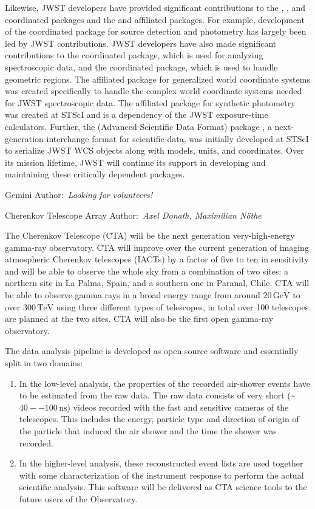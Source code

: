 \documentclass[modern]{aastex631}
\newcommand{\secauthor}[1]{{\color{blue}Author:~\textit{#1}}}
\newcommand{\secunfilled}{{\color{red}Author:~\textit{Looking for volunteers!}}}
\begin{document}
Likewise, JWST developers have provided significant contributions
to the  \citep{photutils}, 
\citep{specutils}, and  \citep{regions} coordinated
packages and the  \citep{gwcs} and 
\citep{synphot} affiliated packages. For example, development of the
 coordinated package for source detection and
photometry has largely been led by JWST contributions. JWST developers
have also made significant contributions to the 
coordinated package, which is used for analyzing spectroscopic data,
and the  coordinated package, which is used to
handle geometric regions. The  affiliated package for
generalized world coordinate systems was created specifically to handle
the complex world coordinate systems needed for JWST spectroscopic
data. The  affiliated package for synthetic photometry
was created at STScI and is a dependency of the JWST exposure-time
calculators. Further, the  (Advanced Scientific Data
Format) package \citep{ASDF}, a next-generation interchange format for
scientific data, was initially developed at STScI to serialize JWST WCS
objects along with \astropypkg models, units, and coordinates. Over
its mission lifetime, JWST will continue its support in developing and
maintaining these critically dependent packages.


Gemini
\secunfilled

Cherenkov Telescope Array
\secauthor{Axel Donath, Maximilian Nöthe}

The Cherenkov Telescope (CTA) will be the next generation very-high-energy
gamma-ray observatory.
CTA will improve over the current generation of imaging atmospheric Cherenkov telescopes (IACTs)
by a factor of five to ten in sensitivity and will be able to observe the whole sky from a combination of two sites:
a northern site in La Palma, Spain, and a southern one in Paranal, Chile.
CTA will be able to observe gamma rays in a broad energy range from around $20\,\mathrm{GeV}$ to over $300\,\mathrm{TeV}$
using three different types of telescopes, in total over 100 telescopes are planned at the two sites.
CTA will also be the first open gamma-ray observatory.

The data analysis pipeline is developed as open source software and essentially split in two domains:
\begin{enumerate}
  \item In the low-level analysis, the properties of the recorded air-shower events
    have to be estimated from the raw data.
    The raw data consists of very short (\textasciitilde $40--100\,\mathrm{ns}$) videos recorded with the fast and
    sensitive cameras of the telescopes.
    This includes the energy, particle type and direction of origin of the particle that induced the air shower
    and the time the shower was recorded.
  \item In the higher-level analysis, these reconstructed event lists are used together with some
    characterization of the instrument response to perform the actual scientific analysis.
    This software will be delivered as CTA science tools to the future users of the Observatory.
\end{enumerate}
\end{document}

